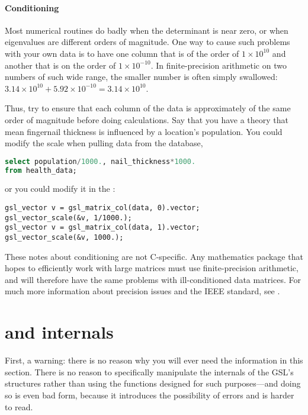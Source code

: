 \paragraph{Conditioning} Most numerical routines do badly when the
determinant is near zero, or when eigenvalues are different orders of magnitude.
One way to cause such problems with your own data is
to have one column that is of the order of $1 \times 10^{10}$ and
another that is on the order of $1 \times 10^{-10}$. In
finite-precision arithmetic on two numbers of such wide range, the
smaller number is often simply swallowed: $3.14 \times 10^{10} + 5.92
\times 10^{-10} = 3.14 \times 10^{10}$. 

Thus, try to ensure that each column of the data is
approximately of the same order of magnitude before doing calculations.
Say that you have a theory that mean fingernail thickness is influenced by
a location's population.
You could modify the scale when pulling data from the database,
\begin{lstlisting}[language=sql]
select population/1000., nail_thickness*1000.
from health_data;
\end{lstlisting}
or you could modify it in the :
\begin{lstlisting}
gsl_vector v = gsl_matrix_col(data, 0).vector;
gsl_vector_scale(&v, 1/1000.);
gsl_vector v = gsl_matrix_col(data, 1).vector;
gsl_vector_scale(&v, 1000.);
\end{lstlisting}

These notes about conditioning are not C-specific. Any mathematics
package that hopes to efficiently work with large matrices must use
finite-precision arithmetic, and will therefore have the same problems
with ill-conditioned data matrices. For much more information about
precision issues and the IEEE standard, see \citet{goldberg:floating}.


\section{\treesymbol{}  and 
internals}
First, a warning: there is no reason why you will ever need the
information in this section. 
There is no reason to specifically manipulate the internals of the GSL's
structures rather than using the functions designed for such
purposes---and doing so is even bad form, because it introduces the
possibility of errors and is harder to read.

